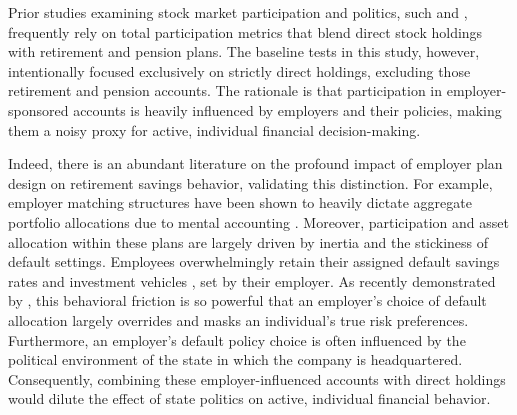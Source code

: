 \begin{table}
    \ContinuedFloat
    \centering

    \caption[]{Comprehensive Stock Market Participation Variations (Cont.)}
    
    \footnotesize
    
    \begin{subtable}{\linewidth}
        \caption{Probit Model}
        \label{tab:6b}
        
    \end{subtable}
    
\end{table}


Prior studies examining stock market participation and politics, such \citet{kaustia2023} and \citet{ke2024}, frequently rely on total participation metrics that blend direct stock holdings with retirement and pension plans. The baseline tests in this study, however, intentionally focused exclusively on strictly direct holdings, excluding those retirement and pension accounts. The rationale is that participation in employer-sponsored accounts is heavily influenced by employers and their policies, making them a noisy proxy for active, individual financial decision-making.

Indeed, there is an abundant literature on the profound impact of employer plan design on retirement savings behavior, validating this distinction. For example, employer matching structures have been shown to heavily dictate aggregate portfolio allocations due to mental accounting \citep{brown2004, choi2009}. Moreover, participation and asset allocation within these plans are largely driven by inertia and the stickiness of default settings. Employees overwhelmingly retain their assigned default savings rates and investment vehicles \citep{choi2001}, set by their employer. As recently demonstrated by \citet{choukhmane2025}, this behavioral friction is so powerful that an employer's choice of default allocation largely overrides and masks an individual's true risk preferences. Furthermore, an employer's default policy choice is often influenced by the political environment of the state in which the company is headquartered. Consequently, combining these employer-influenced accounts with direct holdings would dilute the effect of state politics on active, individual financial behavior.

